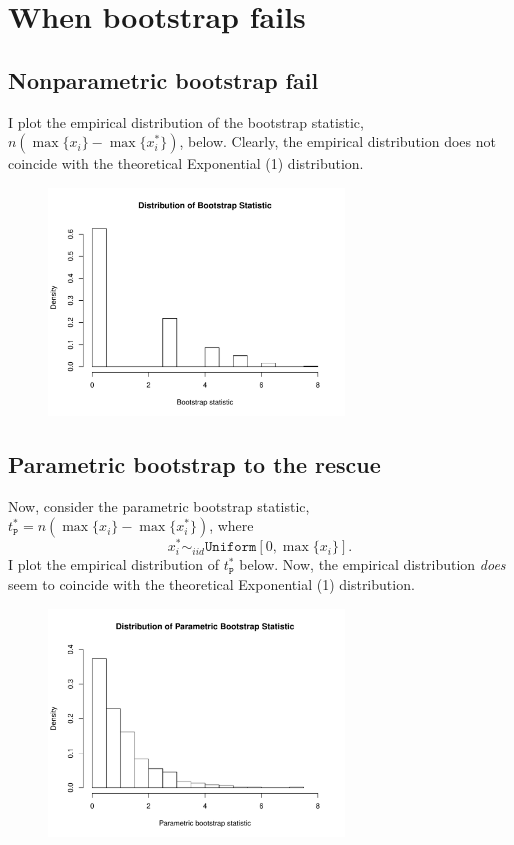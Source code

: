 \documentclass[12pt]{article}
\begin{document}
\newpage

\section{When bootstrap fails}

\subsection{Nonparametric bootstrap fail}
I plot the empirical distribution of the bootstrap statistic, $n(\max\{x_i\} - \max\{x_i^*\})$, below. Clearly, the empirical distribution does not coincide with the theoretical Exponential (1) distribution.

\begin{figure}[!htpb]
    \centering
    
        \includegraphics[width=0.7\textwidth]{freq.pdf}

\end{figure}

\subsection{Parametric bootstrap to the rescue}
Now, consider the parametric bootstrap statistic, $t^*_{\texttt{P}}= n(\max\{x_i\} - \max\{x_i^*\})$, where $$x_i^* \sim_{iid} \texttt{Uniform}[0,\max\{x_i\}].$$ I plot the empirical distribution of $t^*_{\texttt{P}}$ below. Now, the empirical distribution \textit{does} seem to coincide with the theoretical Exponential (1) distribution.

\begin{figure}[!htpb]
    \centering
    
        \includegraphics[width=0.7\textwidth]{freq2.pdf}

\end{figure}
\end{document}
